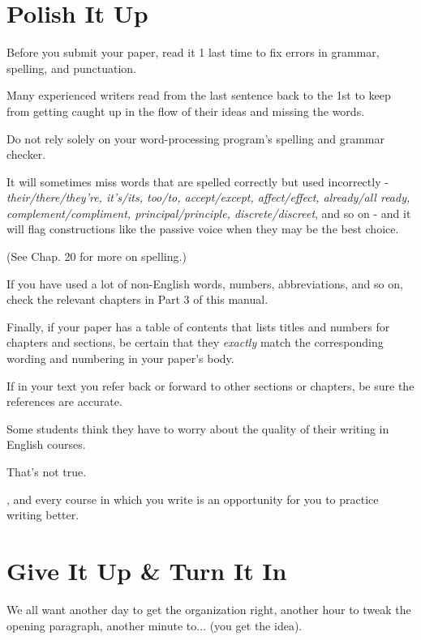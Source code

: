 \documentclass[oneside]{book}
\numberwithin{equation}{section}
\begin{document}

\section{Polish It Up}
Before you submit your paper, read it 1 last time to fix errors in grammar, spelling, and punctuation.

Many experienced writers read from the last sentence back to the 1st to keep from getting caught up in the flow of their ideas and missing the words.

Do not rely solely on your word-processing program's spelling and grammar checker.

It will sometimes miss words that are spelled correctly but used incorrectly - \textit{their/there/they're, it's/its, too/to, accept/except, affect/effect, already/all ready, complement/compliment, principal/principle, discrete/discreet}, and so on - and it will flag constructions like the passive voice when they may be the best choice.

(See Chap. 20 for more on spelling.)

%
If you have used a lot of non-English words, numbers, abbreviations, and so on, check the relevant chapters in Part 3 of this manual.

%
Finally, if your paper has a table of contents that lists titles and numbers for chapters and sections, be certain that they \textit{exactly} match the corresponding wording and numbering in your paper's body.

If in your text you refer back or forward to other sections or chapters, be sure the references are accurate.

%
Some students think they have to worry about the quality of their writing in English courses.

That's not true.

, and every course in which you write is an opportunity for you to practice writing better.

\section{Give It Up \& Turn It In}

We all want another day to get the organization right, another hour to tweak the opening paragraph, another minute to$\ldots$ (you get the idea).
\end{document}
